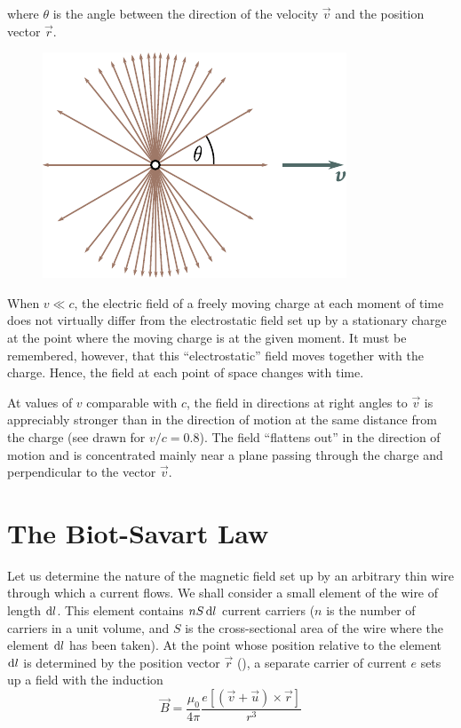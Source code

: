 \noindent
where $\theta$ is the angle between the direction of the velocity $\vec{v}$ and the position vector $\vec{r}$.

\begin{figure}[t]
	\begin{center}
		\includegraphics[scale=1]{figures/ch_06/fig_6_2.pdf}
		\caption[]{}
		\label{fig:6_2}
	\end{center}
	\vspace{-0.8cm}
\end{figure}

When $v\ll c$, the electric field of a freely moving charge at each moment of time does not virtually differ from the electrostatic field set up by a stationary charge at the point where the moving charge is at the given moment. It must be remembered, however, that this ``electrostatic'' field moves together with the charge. Hence, the field at each point of space changes with time.

At values of $v$ comparable with $c$, the field in directions at right angles to $\vec{v}$ is appreciably stronger than in the direction of motion at the same distance from the charge (see  drawn for $v/c=0.8$). The field ``flattens out'' in the direction of motion and is concentrated mainly near a plane passing through the charge and perpendicular to the vector $\vec{v}$.

\section{The Biot-Savart Law}\label{sec:6_4}

Let us determine the nature of the magnetic field set up by an arbitrary thin wire through which a current flows. We shall consider a small element of the wire of length $\mathrm{d} l$. This element contains $nS\, \mathrm{d} l$ current carriers ($n$ is the number of carriers in a unit volume, and $S$ is the cross-sectional area of the wire where the element $\mathrm{d} l$ has been taken). At the point whose position relative to the element $\mathrm{d} l$ is determined by the position vector $\vec{r}$ (), a separate carrier of current $e$ sets up a field with the induction
\begin{equation*}
    \vec{B} = \frac{\mu_0}{4\pi} \frac{e [(\vec{v} + \vec{u}) \times \vec{r}]}{r^3}
\end{equation*}

